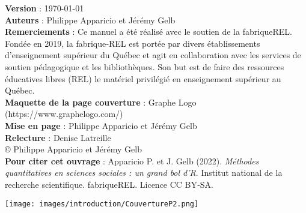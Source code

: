 


\textbf{Version} : \today{} \\[0.05in]
\textbf{Auteurs} : Philippe Apparicio et Jérémy Gelb\\[0.05in]
\textbf{Remerciements} : Ce manuel a été réalisé avec le soutien de la fabriqueREL. Fondée en 2019, la fabrique‑REL est portée par divers établissements d’enseignement supérieur du Québec et agit en collaboration avec les services de soutien pédagogique et les bibliothèques. Son but est de faire des ressources éducatives libres (REL) le matériel privilégié en enseignement supérieur au Québec.\\[0.05in]
\textbf{Maquette de la page couverture} : Graphe Logo (https://www.graphelogo.com/)\\[0.05in]
\textbf{Mise en page} : Philippe Apparicio et Jérémy Gelb\\[0.05in]
\textbf{Relecture} : Denise Latreille\\[0.2in]

© Philippe Apparicio et Jérémy Gelb\\[0.2in]

\textbf{Pour citer cet ouvrage} : Apparicio P. et J. Gelb (2022). \textit{Méthodes quantitatives en sciences sociales : un grand bol d’R}. Institut national de la recherche scientifique. fabriqueREL. Licence CC BY‑SA.\\[1in]

\begin{center}
\texttt{[image: images/introduction/CouvertureP2.png]}
\end{center}




\renewcommand*\listfigurename{Liste des figures}
\renewcommand*\listtablename{Liste des tableaux}

